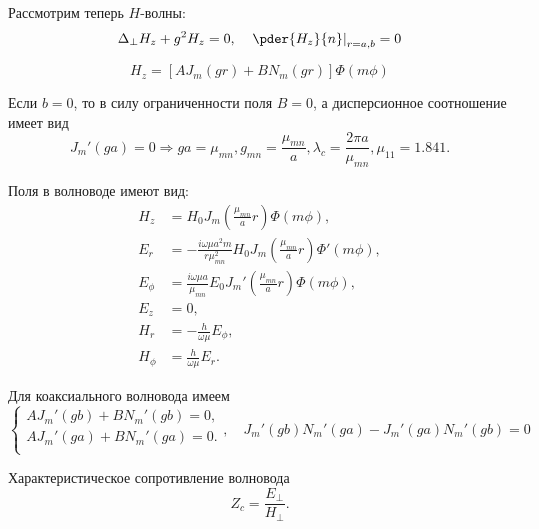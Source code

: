 Рассмотрим теперь \( H \)-волны:
\[
	\Delta_\perp H_z + g^2H_z = 0,\quad \left.\pder{H_z}{n}\right|_{r=a,b}= 0
\]

\[
	H_z = [AJ_m(gr) + BN_m(gr)]\Phi(m\phi)
\]

Если \( b=0 \), то в силу ограниченности поля \(B = 0\), а дисперсионное соотношение имеет вид
\[
	J_m'(ga) = 0 \Rightarrow ga = \mu_{mn}, g_{mn} = \frac{\mu_{mn}}{a}, \lambda_c = \frac{2\pi a}{\mu_{mn}}, \mu_{11} = 1.841.
\]

Поля в волноводе имеют вид:
\begin{align*}
	H_z &= H_0 J_m(\frac{\mu_{mn}}{a}r)\Phi(m\phi),\\
	E_r &= -\frac{i\omega\mu a^2m}{r\mu_{mn}^2}H_0 J_m(\frac{\mu_{mn}}{a}r)\Phi'(m\phi),\\
	E_\phi &= \frac{i\omega\mu a}{\mu_{mn}}E_0 J_m'(\frac{\mu_{mn}}{a}r)\Phi(m\phi),\\
	E_z &= 0,\\
	H_r &= -\frac{h}{\omega\mu}E_\phi,\\
	H_\phi &= \frac{h}{\omega\mu}E_r.
\end{align*}

Для коаксиального волновода имеем
\[
	\begin{cases}
		AJ_m'(gb) + BN_m'(gb) = 0,\\
		AJ_m'(ga) + BN_m'(ga) = 0.\\
	\end{cases},
	\quad
	J_m'(gb)N_m'(ga) - J_m'(ga)N_m'(gb) = 0
\]

Характеристическое сопротивление волновода
\[
	Z_c = \frac{E_\perp}{H_\perp}.
\]
